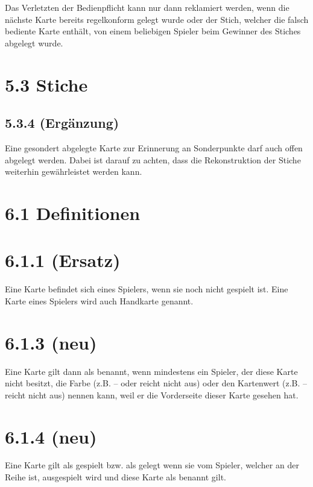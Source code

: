 Das Verletzten der Bedienpflicht kann nur dann reklamiert werden, wenn die
nächste Karte bereits regelkonform gelegt wurde oder der Stich, welcher die
falsch bediente Karte enthält, von einem beliebigen Spieler beim Gewinner des
Stiches abgelegt wurde.

\section*{5.3 Stiche}

\subsection*{5.3.4 (Ergänzung)}

Eine gesondert abgelegte Karte zur Erinnerung an Sonderpunkte darf auch
offen abgelegt werden. Dabei ist darauf zu achten, dass die
Rekonstruktion der Stiche weiterhin gewährleistet werden kann.

\section*{6.1 Definitionen}

\section*{6.1.1 (Ersatz)}

Eine Karte befindet sich  eines Spielers, wenn sie noch nicht
gespielt ist. Eine Karte  eines Spielers wird auch Handkarte
genannt.

\section*{6.1.3 (neu)}

Eine Karte gilt dann als benannt, wenn mindestens ein Spieler, der diese Karte
nicht besitzt, die Farbe (z.B.  --  oder 
reicht nicht aus) oder den Kartenwert (z.B.  --  reicht
nicht aus) nennen kann, weil er die Vorderseite dieser Karte gesehen hat.

\section*{6.1.4 (neu)}

Eine Karte gilt als gespielt bzw. als gelegt wenn sie vom Spieler, welcher an
der Reihe ist, ausgespielt wird und diese Karte als benannt gilt.

